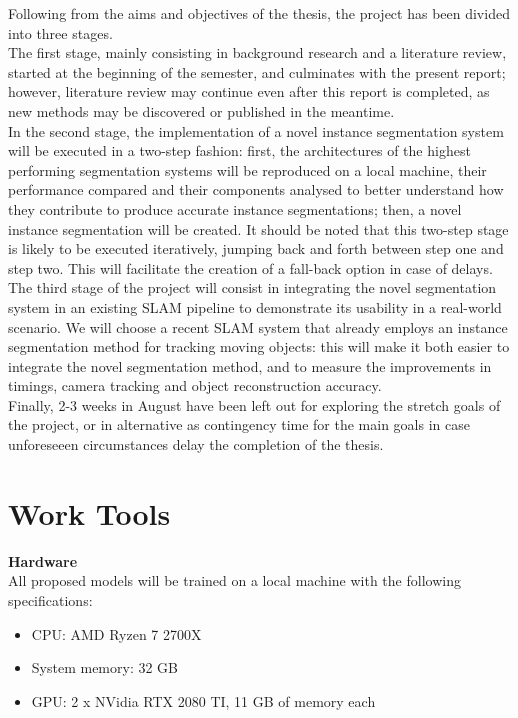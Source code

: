 \documentclass[12pt,twoside]{report}
\begin{document}
Following from the aims and objectives of the thesis, the project has been divided into three stages.
\\

The first stage, mainly consisting in background research and a literature review, started at the beginning of the semester, and culminates with the present report; however, literature review may continue even after this report is completed, as new methods may be discovered or published in the meantime.
\\

In the second stage, the implementation of a novel instance segmentation system will be executed in a two-step fashion: first, the architectures of the highest performing segmentation systems will be reproduced on a local machine, their performance compared and their components analysed to better understand how they contribute to produce accurate instance segmentations; then, a novel instance segmentation will be created. It should be noted that this two-step stage is likely to be executed iteratively, jumping back and forth between step one and step two. This will facilitate the creation of a fall-back option in case of delays.
\\

The third stage of the project will consist in integrating the novel segmentation system in an existing SLAM pipeline to demonstrate its usability in a real-world scenario. We will choose a recent SLAM system that already employs an instance segmentation method for tracking moving objects: this will make it both easier to integrate the novel segmentation method, and to measure the improvements in timings, camera tracking and object reconstruction accuracy.
\\

Finally, 2-3 weeks in August have been left out for exploring the stretch goals of the project, or in alternative as contingency time for the main goals in case unforeseeen circumstances delay the completion of the thesis.


\section{Work Tools}

\textbf{Hardware}
\\

All proposed models will be trained on a local machine with the following specifications:

\begin{itemize}
\item CPU: AMD Ryzen 7 2700X
\item System memory: 32 GB
\item GPU: 2 x NVidia RTX 2080 TI, 11 GB of memory each
\end{itemize}
\end{document}
